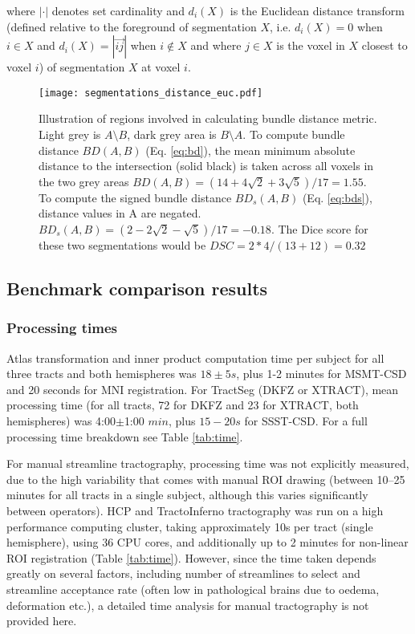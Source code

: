 where $| \cdot |$ denotes set cardinality and $d_i(X)$ is the Euclidean distance transform (defined relative to the foreground of segmentation $X$, i.e. $d_i(X) = 0$ when $i \in X $ and $d_i(X) = |\overrightarrow{ij}|$ when $i \not\in X$ and where $j \in X$ is the voxel in $X$ closest to voxel $i$)  of segmentation $X$ at voxel $i$.

\begin{figure}
  \centering
  \texttt{[image: segmentations\_distance\_euc.pdf]}
  \caption{Illustration of regions involved in calculating bundle distance metric. Light grey is $A\setminus B$, dark grey area is $B\setminus A$. To compute bundle distance $BD(A,B)$ (Eq. \ref{eq:bd}), the mean minimum absolute distance to the intersection (solid black) is taken across all voxels in the two grey areas $BD(A,B) = (14+4\sqrt{2}+3\sqrt{5})/17 = 1.55$. To compute the signed bundle distance $BD_s(A,B)$ (Eq. \ref{eq:bds}), distance values in A are negated. $BD_s(A,B) = (2-2\sqrt{2}-\sqrt{5})/17 = -0.18$. The Dice score for these two segmentations would be $DSC = 2*4/(13+12) = 0.32$}
  \label{fig:BD}
\end{figure}

\subsection{Benchmark comparison results}

\subsubsection{Processing times}

Atlas transformation and inner product computation time per subject for all three tracts and both hemispheres was $18\pm5 s$, plus 1-2 minutes for MSMT-CSD and 20 seconds for MNI registration.
For TractSeg (DKFZ or XTRACT), mean processing time (for all tracts, 72 for DKFZ and 23 for XTRACT, both hemispheres) was 4:00$\pm$1:00 $min$, plus $15-20 s$ for SSST-CSD.
For a full processing time breakdown see Table \ref{tab:time}.

For manual streamline tractography, processing time was not explicitly measured, due to the high variability that comes with manual ROI drawing (between 10--25 minutes for all tracts in a single subject, although this varies significantly between operators).
HCP and TractoInferno tractography was run on a high performance computing cluster, taking approximately 10s per tract (single hemisphere), using 36 CPU cores, and additionally up to 2 minutes for non-linear ROI registration (Table \ref{tab:time}).
However, since the time taken depends greatly on several factors, including number of streamlines to select and streamline acceptance rate (often low in pathological brains due to oedema, deformation etc.), a detailed time analysis for manual tractography is not provided here.

